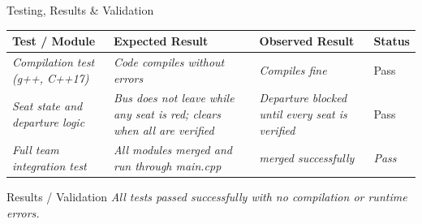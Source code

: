 \documentclass[aspectratio=169,11pt]{beamer}
\newcommand{\smallnote}[1]{%
\vspace{0.08cm}
{\scriptsize\color{GEUGrey}#1}
}
\newcommand{\placeholder}[1]{%
\textit{\color{GEUGrey}#1}
}
\begin{document}
\begin{frame}{Testing, Results \& Validation}

\scriptsize

\begin{center}

\renewcommand{\arraystretch}{1.3}

\begin{tabularx}{.96\textwidth}
{@{}p{2.1cm}X X p{1.4cm}@{}}

\toprule
Test / Module &
Expected Result &
Observed Result &
Status\\
\midrule

\placeholder{Compilation test (g++, C++17)} &
\placeholder{Code compiles without errors} &
\placeholder{Compiles fine} &
Pass\\

\placeholder{Seat state and departure logic} &
\placeholder{Bus does not leave while any seat is red; clears when all are verified} &
\placeholder{Departure blocked until every seat is verified} &
Pass\\

\placeholder{Full team integration test} &
\placeholder{All modules merged and run through main.cpp} &
\placeholder{merged successfully} &
\placeholder{Pass}\\

\bottomrule

\end{tabularx}

\end{center}

\vspace{3mm}

\begin{block}{Results / Validation}
\placeholder{
All tests passed successfully with no compilation or runtime errors.
}
\end{block}


\end{frame}
\end{document}
